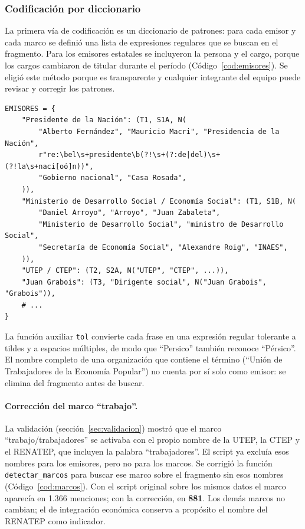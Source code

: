 \documentclass[11pt,a4paper]{article}
\begin{document}
\subsubsection{Codificación por diccionario}

La primera vía de codificación es un diccionario de patrones: para cada emisor y cada marco se definió una lista de expresiones regulares que se buscan en el fragmento. Para los emisores estatales se incluyeron la persona y el cargo, porque los cargos cambiaron de titular durante el período (Código~\ref{cod:emisores}). Se eligió este método porque es transparente y cualquier integrante del equipo puede revisar y corregir los patrones.

\begin{lstlisting}[caption={Fragmento del diccionario de emisores (\texttt{analisis\_emisores\_marcos.py}).}, label=cod:emisores]
EMISORES = {
    "Presidente de la Nación": (T1, S1A, N(
        "Alberto Fernández", "Mauricio Macri", "Presidencia de la Nación",
        r"re:\bel\s+presidente\b(?!\s+(?:de|del)\s+(?!la\s+naci[oó]n))",
        "Gobierno nacional", "Casa Rosada",
    )),
    "Ministerio de Desarrollo Social / Economía Social": (T1, S1B, N(
        "Daniel Arroyo", "Arroyo", "Juan Zabaleta",
        "Ministerio de Desarrollo Social", "ministro de Desarrollo Social",
        "Secretaría de Economía Social", "Alexandre Roig", "INAES",
    )),
    "UTEP / CTEP": (T2, S2A, N("UTEP", "CTEP", ...)),
    "Juan Grabois": (T3, "Dirigente social", N("Juan Grabois", "Grabois")),
    # ...
}
\end{lstlisting}

La función auxiliar \texttt{tol} convierte cada frase en una expresión regular tolerante a tildes y a espacios múltiples, de modo que \enquote{Persico} también reconoce \enquote{Pérsico}. El nombre completo de una organización que contiene el término (\enquote{Unión de Trabajadores de la Economía Popular}) no cuenta por sí solo como emisor: se elimina del fragmento antes de buscar.

\paragraph{Corrección del marco \enquote{trabajo}.} La validación (sección~\ref{sec:validacion}) mostró que el marco \enquote{trabajo/trabajadores} se activaba con el propio nombre de la UTEP, la CTEP y el RENATEP, que incluyen la palabra \enquote{trabajadores}. El script ya excluía esos nombres para los emisores, pero no para los marcos. Se corrigió la función \texttt{detectar\_marcos} para buscar ese marco sobre el fragmento sin esos nombres (Código~\ref{cod:marcos}). Con el script original sobre los mismos datos el marco aparecía en 1.366 menciones; con la corrección, en \textbf{881}. Los demás marcos no cambian; el de integración económica conserva a propósito el nombre del RENATEP como indicador.
\end{document}
